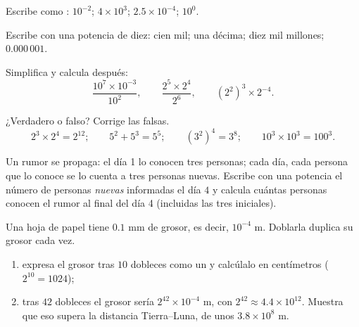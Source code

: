 \begin{exercise}[$\star$]\label{exo:g8:powers:4}
Escribe como : $10^{-2}$; \quad $4 \times 10^3$; \quad
$2.5 \times 10^{-4}$; \quad $10^0$.
\end{exercise}

\begin{exercise}[$\star$]\label{exo:g8:powers:5}
Escribe con una potencia de diez: cien mil; una décima; diez mil
millones; $0.000\,001$.
\end{exercise}

\begin{exercise}[$\star$]\label{exo:g8:powers:6}
Simplifica y calcula después:
\[
\frac{10^7 \times 10^{-3}}{10^2},
\qquad
\frac{2^5 \times 2^4}{2^6},
\qquad
\left(2^2\right)^3 \times 2^{-4} .
\]
\end{exercise}

\begin{exercise}[$\star$]\label{exo:g8:powers:7}
¿Verdadero o falso? Corrige las falsas.
\[
2^3 \times 2^4 = 2^{12}; \qquad
5^2 + 5^3 = 5^5; \qquad
(3^2)^4 = 3^8; \qquad
10^3 \times 10^3 = 100^3 .
\]
\end{exercise}

\begin{exercise}[$\star\star$]\label{exo:g8:powers:8}
Un rumor se propaga: el día 1 lo conocen tres personas; cada día, cada
persona que lo conoce se lo cuenta a tres personas nuevas. Escribe con una potencia el número
de personas \emph{nuevas} informadas el día $4$ y calcula cuántas personas
conocen el rumor al final del día 4 (incluidas las tres iniciales).
\end{exercise}

\begin{exercise}[$\star\star$]\label{exo:g8:powers:9}
Una hoja de papel tiene $0.1$ mm de grosor, es decir, $10^{-4}$ m. Doblarla
duplica su grosor cada vez.
\begin{enumerate}
  \item expresa el grosor tras $10$ dobleces como un  y
        calcúlalo en centímetros ($2^{10} = 1024$);
  \item tras $42$ dobleces el grosor sería
        $2^{42} \times 10^{-4}$ m, con $2^{42} \approx 4.4 \times
        10^{12}$. Muestra que eso supera la distancia Tierra--Luna,
        de unos $3.8 \times 10^8$ m.
\end{enumerate}
\end{exercise}

